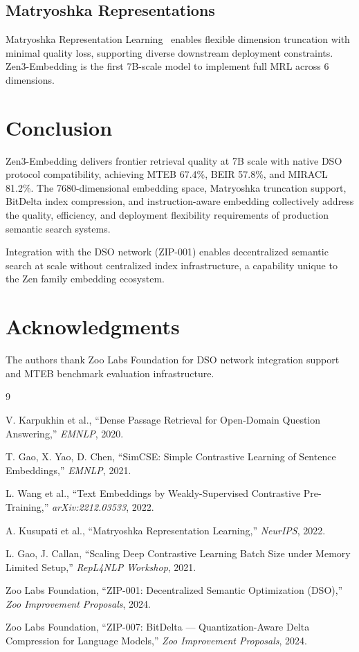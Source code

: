 \documentclass[11pt,a4paper]{article}
\begin{document}
\subsection{Matryoshka Representations}

Matryoshka Representation Learning~\cite{mrl} enables flexible dimension truncation
with minimal quality loss, supporting diverse downstream deployment constraints.
Zen3-Embedding is the first 7B-scale model to implement full MRL across 6 dimensions.

\section{Conclusion}
\label{sec:conclusion}

Zen3-Embedding delivers frontier retrieval quality at 7B scale with native DSO
protocol compatibility, achieving MTEB 67.4\%, BEIR 57.8\%, and MIRACL 81.2\%.
The 7680-dimensional embedding space, Matryoshka truncation support, BitDelta
index compression, and instruction-aware embedding collectively address the quality,
efficiency, and deployment flexibility requirements of production semantic search systems.

Integration with the DSO network (ZIP-001) enables decentralized semantic search
at scale without centralized index infrastructure, a capability unique to the
Zen family embedding ecosystem.

\section*{Acknowledgments}

The authors thank Zoo Labs Foundation for DSO network integration support and
MTEB benchmark evaluation infrastructure.


\begin{thebibliography}{9}

V. Karpukhin et al.,
``Dense Passage Retrieval for Open-Domain Question Answering,''
\textit{EMNLP}, 2020.

T. Gao, X. Yao, D. Chen,
``SimCSE: Simple Contrastive Learning of Sentence Embeddings,''
\textit{EMNLP}, 2021.

L. Wang et al.,
``Text Embeddings by Weakly-Supervised Contrastive Pre-Training,''
\textit{arXiv:2212.03533}, 2022.

A. Kusupati et al.,
``Matryoshka Representation Learning,''
\textit{NeurIPS}, 2022.

L. Gao, J. Callan,
``Scaling Deep Contrastive Learning Batch Size under Memory Limited Setup,''
\textit{RepL4NLP Workshop}, 2021.

Zoo Labs Foundation,
``ZIP-001: Decentralized Semantic Optimization (DSO),''
\textit{Zoo Improvement Proposals}, 2024.

Zoo Labs Foundation,
``ZIP-007: BitDelta --- Quantization-Aware Delta Compression for Language Models,''
\textit{Zoo Improvement Proposals}, 2024.

\end{thebibliography}
\end{document}
